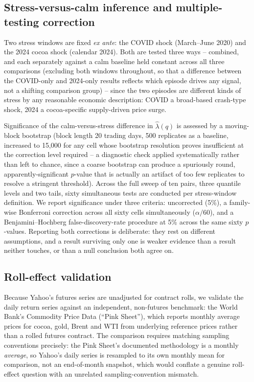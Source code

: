 \documentclass[final,3p,times,authoryear]{elsarticle}
\begin{document}
\subsection{Stress-versus-calm inference and multiple-testing correction}
\label{sec:inference-method}

Two stress windows are fixed \emph{ex ante}: the COVID shock (March--June
2020) and the 2024 cocoa shock (calendar 2024). Both are tested three
ways -- combined, and each separately against a calm baseline held
constant across all three comparisons (excluding both windows throughout,
so that a difference between the COVID-only and 2024-only results
reflects which episode drives any signal, not a shifting comparison
group) -- since the two episodes are different kinds of stress by any
reasonable economic description: COVID a broad-based crash-type shock,
2024 a cocoa-specific supply-driven price surge.

Significance of the calm-versus-stress difference in $\hat\lambda(q)$ is
assessed by a moving-block bootstrap \citep{kunsch1989} (block length 20
trading days, 500 replicates as a baseline, increased to 15,000 for any
cell whose bootstrap resolution proves insufficient at the correction
level required -- a diagnostic check applied systematically rather than
left to chance, since a coarse bootstrap can produce a spuriously round,
apparently-significant $p$-value that is actually an artifact of too few
replicates to resolve a stringent threshold). Across the full sweep of
ten pairs, three quantile levels and two tails, sixty simultaneous tests
are conducted per stress-window definition. We report significance under
three criteria: uncorrected (5\%), a family-wise Bonferroni correction
across all sixty cells simultaneously ($\alpha/60$), and a
Benjamini--Hochberg false-discovery-rate procedure at 5\% across the
same sixty $p$-values. Reporting both corrections is deliberate: they
rest on different assumptions, and a result surviving only one is weaker
evidence than a result neither touches, or than a null conclusion both
agree on.

\subsection{Roll-effect validation}
\label{sec:pinksheet-method}

Because Yahoo's futures series are unadjusted for contract rolls, we
validate the daily return series against an independent, non-futures
benchmark: the World Bank's Commodity Price Data (``Pink Sheet''),
which reports monthly average prices for cocoa, gold, Brent and WTI from
underlying reference prices rather than a rolled futures contract. The
comparison requires matching sampling conventions precisely: the Pink
Sheet's documented methodology is a monthly \emph{average}, so Yahoo's
daily series is resampled to its own monthly mean for comparison, not an
end-of-month snapshot, which would conflate a genuine roll-effect
question with an unrelated sampling-convention mismatch.
\end{document}
